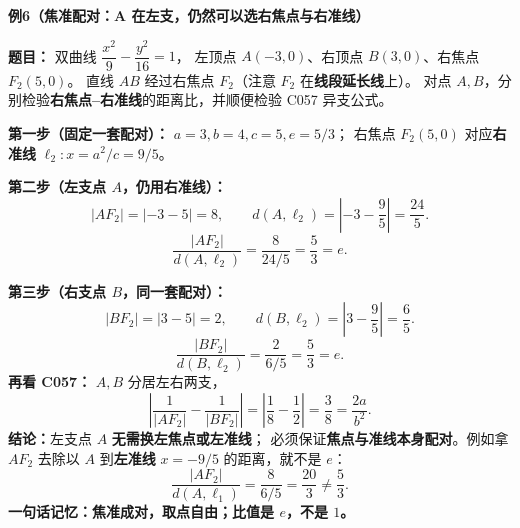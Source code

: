 \clearpage
\begin{examplebox}
  \textbf{\textcolor{CExample}{例6（焦准配对：A 在左支，仍然可以选右焦点与右准线）}}

  \textbf{题目：} 双曲线 $\dfrac{x^2}{9}-\dfrac{y^2}{16}=1$，
  左顶点 $A(-3,0)$、右顶点 $B(3,0)$、右焦点 $F_2(5,0)$。
  直线 $AB$ 经过右焦点 $F_2$（注意 $F_2$ 在\textbf{线段延长线}上）。
  对点 $A,B$，分别检验\textbf{右焦点--右准线}的距离比，并顺便检验 C057 异支公式。

  \textbf{第一步（固定一套配对）：} $a=3,b=4,c=5,e=5/3$；
  右焦点 $F_2(5,0)$ 对应\textbf{右准线} $\ell_2:x=a^2/c=9/5$。

  \textbf{第二步（左支点 $A$，仍用右准线）：}
  \[
    |AF_2|=|-3-5|=8,\qquad
    d(A,\ell_2)=\left|-3-\frac95\right|=\frac{24}{5}.
  \]
  \[
    \boxed{\frac{|AF_2|}{d(A,\ell_2)}=\frac{8}{24/5}=\frac53=e}.
  \]

  \textbf{第三步（右支点 $B$，同一套配对）：}
  \[
    |BF_2|=|3-5|=2,\qquad
    d(B,\ell_2)=\left|3-\frac95\right|=\frac65.
  \]
  \[
    \boxed{\frac{|BF_2|}{d(B,\ell_2)}=\frac{2}{6/5}=\frac53=e}.
  \]
  \textbf{再看 C057：} $A,B$ 分居左右两支，
  \[
     \left|\frac1{|AF_2|}-\frac1{|BF_2|}\right|
     =\left|\frac18-\frac12\right|=\frac38
     =\frac{2a}{b^2}.
  \]
  \textbf{结论：}左支点 $A$ \textbf{无需换左焦点或左准线}；
  必须保证\textbf{焦点与准线本身配对}。例如拿 $AF_2$ 去除以
  $A$ 到\textbf{左准线} $x=-9/5$ 的距离，就不是 $e$：
  \[
    \frac{|AF_2|}{d(A,\ell_1)}=\frac8{6/5}=\frac{20}{3}\ne\frac53.
  \]
  \textbf{一句话记忆：焦准成对，取点自由；比值是 $e$，不是 $1$。}
\end{examplebox}



